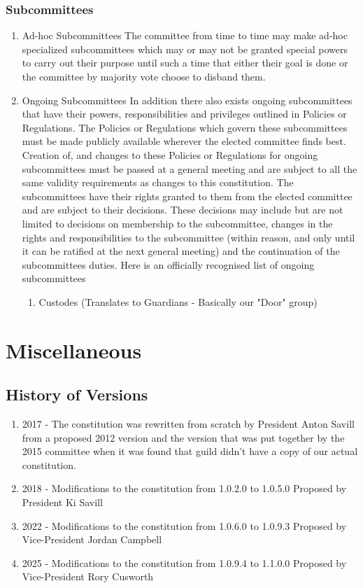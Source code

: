 \documentclass[10pt,a4paper]{report}
\begin{document}
		\subsection{Subcommittees}
			\begin{enumerate}[label=\arabic*]
			\item Ad-hoc Subcommittees
				The committee from time to time may make ad-hoc specialized subcommittees which may or may not be granted special powers to carry out their purpose until such a time that either their goal is done or the committee by majority vote choose to disband them.
			\item Ongoing Subcommittees 
				In addition there also exists ongoing subcommittees that have their powers, responsibilities and privileges outlined in Policies or Regulations.
				The Policies or Regulations which govern these subcommittees must be made publicly available wherever the elected committee finds best.
				Creation of, and changes to these Policies or Regulations for ongoing subcommittees must be passed at a general meeting and are subject to all the same validity requirements as changes to this constitution.
				The subcommittees have their rights granted to them from the elected committee and are subject to their decisions. These decisions may include but are not limited to decisions on membership to the subcommittee, changes in the rights and responsibilities to the subcommittee (within reason, and only until it can be ratified at the next general meeting) and the continuation of the subcommittees duties.
				Here is an officially recognised list of ongoing subcommittees
				\begin{enumerate}[label=\arabic*]
					\item Custodes (Translates to Guardians - Basically our "Door" group)
				\end{enumerate}
				\end{enumerate}

	\chapter{Miscellaneous}
		\section{History of Versions}
		    \begin{enumerate}[label=\arabic*]
			\item 2017 - The constitution was rewritten from scratch by President Anton Savill from a proposed 2012 version and the version that was put together by the 2015 committee when it was found that guild didn't have a copy of our actual constitution.
			\item 2018 - Modifications to the constitution from 1.0.2.0 to 1.0.5.0 Proposed by President Ki Savill
			\item 2022 - Modifications to the constitution from 1.0.6.0 to 1.0.9.3 Proposed by Vice-President Jordan Campbell
			\item 2025 - Modifications to the constitution from 1.0.9.4 to 1.1.0.0 Proposed by Vice-President Rory Cusworth
			\end{enumerate}
\end{document}
